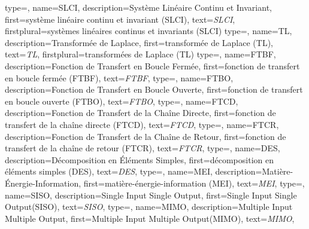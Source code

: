 {%
  type=\acronymtype,%
  name={SLCI},%
  description={Système Linéaire Continu et Invariant},%
  first={système linéaire continu et invariant (SLCI)},%
  text={\emph{{\scshape SLCI}}},%
  firstplural={systèmes\- linéaires\- continus\- et\- invariants\- (SLCI)}%
}
{%
  type=\acronymtype,%
  name={TL},%
  description={Transformée de Laplace},%
  first={transformée de Laplace (TL)},%
  text={\emph{{\scshape TL}}},%
  firstplural={transformées de Laplace (TL)}%
}
{%
  type=\acronymtype,%
  name={FTBF},%
  description={Fonction de Transfert en Boucle Fermée},%
  first={fonction de transfert en boucle fermée (FTBF)},%
  text={\emph{{\scshape FTBF}}},%
}
{%
  type=\acronymtype,%
  name={FTBO},%
  description={Fonction de Transfert en Boucle Ouverte},%
  first={fonction de transfert en boucle ouverte (FTBO)},%
  text={\emph{{\scshape FTBO}}},%
}
{%
  type=\acronymtype,%
  name={FTCD},%
  description={Fonction de Transfert de la Chaîne Directe},%
  first={fonction de transfert de la chaîne directe (FTCD)},%
  text={\emph{{\scshape FTCD}}},%
}
{%
  type=\acronymtype,%
  name={FTCR},%
  description={Fonction de Transfert de la Chaîne de Retour},%
  first={fonction de transfert de la chaîne de retour (FTCR)},%
  text={\emph{{\scshape FTCR}}},%
}
{%
  type=\acronymtype,%
  name={DES},%
  description={Décomposition en \'Eléments Simples},%
  first={dé\-compo\-sition\- en\- éléments\- simples\- (DES)},%
  text={\emph{{\scshape DES}}},%
}
{%
  type=\acronymtype,%
  name={MEI},%
  description={Matière-\'Energie-Information},%
  first={matière-énergie-information (MEI)},%
  text={\emph{{\scshape MEI}}},%
}
{%
  type=\acronymtype,%
  name={SISO},%
  description={Single Input Single Output},%
  first={\og Single Input Single Output\fg (SISO)},%
  text={\emph{{\scshape SISO}}},%
}
{%
  type=\acronymtype,%
  name={MIMO},%
  description={Multiple Input Multiple Output},%
  first={\og Multiple Input Multiple Output\fg (MIMO)},%
  text={\emph{{\scshape MIMO}}},%
}
